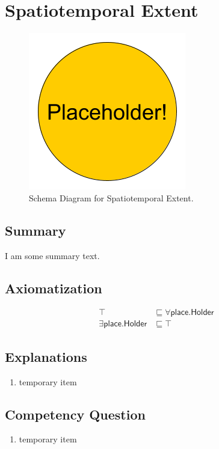 \section{Spatiotemporal Extent}
\label{sec:Spatiotemporal}
\begin{figure}[h!]
\begin{center}
\includegraphics[width=.4\textwidth]{figures/placeholder}
\end{center}
\caption{Schema Diagram for Spatiotemporal Extent.}
\label{fig:Spatiotemporal}
\end{figure}
\subsection{Summary}
\label{sum:Spatiotemporal}
I am some summary text.

\subsection{Axiomatization}
\label{axs:Spatiotemporal}
\begin{align}
\top &\sqsubseteq \forall\textsf{place.Holder} \\ 
\exists\textsf{place.Holder} &\sqsubseteq \top 
\end{align}

\subsection{Explanations}
\label{exp:Spatiotemporal}
\begin{enumerate}
\item temporary item
\end{enumerate}

\subsection{Competency Question}
\label{cqs:Spatiotemporal}
\begin{enumerate}[CQ1.]
\item temporary item
\end{enumerate}

\newpage
